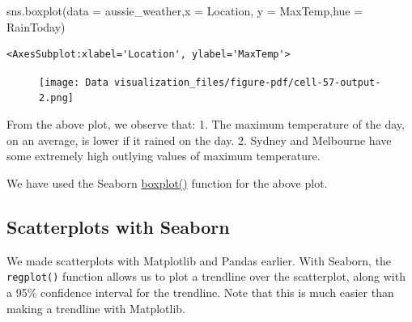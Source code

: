 \documentclass[
  letterpaper,
  DIV=11,
  numbers=noendperiod]{scrreprt}
\newenvironment{Shaded}{\begin{snugshade}}{\end{snugshade}}
\newcommand{\NormalTok}[1]{\textcolor[rgb]{0.00,0.23,0.31}{#1}}
\newcommand{\OperatorTok}[1]{\textcolor[rgb]{0.37,0.37,0.37}{#1}}
\newcommand{\StringTok}[1]{\textcolor[rgb]{0.13,0.47,0.30}{#1}}
\begin{document}
\begin{Shaded}
\begin{Highlighting}[]
\NormalTok{sns.boxplot(data }\OperatorTok{=}\NormalTok{ aussie\_weather,x }\OperatorTok{=} \StringTok{\textquotesingle{}Location\textquotesingle{}}\NormalTok{, y }\OperatorTok{=} \StringTok{\textquotesingle{}MaxTemp\textquotesingle{}}\NormalTok{,hue }\OperatorTok{=} \StringTok{\textquotesingle{}RainToday\textquotesingle{}}\NormalTok{)}
\end{Highlighting}
\end{Shaded}

\begin{verbatim}
<AxesSubplot:xlabel='Location', ylabel='MaxTemp'>
\end{verbatim}

\begin{figure}[H]

{\centering \texttt{[image: Data visualization\_files/figure-pdf/cell-57-output-2.png]}

}

\end{figure}

From the above plot, we observe that: 1. The maximum temperature of the
day, on an average, is lower if it rained on the day. 2. Sydney and
Melbourne have some extremely high outlying values of maximum
temperature.

We have used the Seaborn
\href{https://seaborn.pydata.org/generated/seaborn.boxplot.html}{boxplot()}
function for the above plot.

\hypertarget{scatterplots-with-seaborn}{%
\subsection{Scatterplots with Seaborn}\label{scatterplots-with-seaborn}}

We made scatterplots with Matplotlib and Pandas earlier. With Seaborn,
the \texttt{regplot()} function allows us to plot a trendline over the
scatterplot, along with a 95\% confidence interval for the trendline.
Note that this is much easier than making a trendline with Matplotlib.
\end{document}
